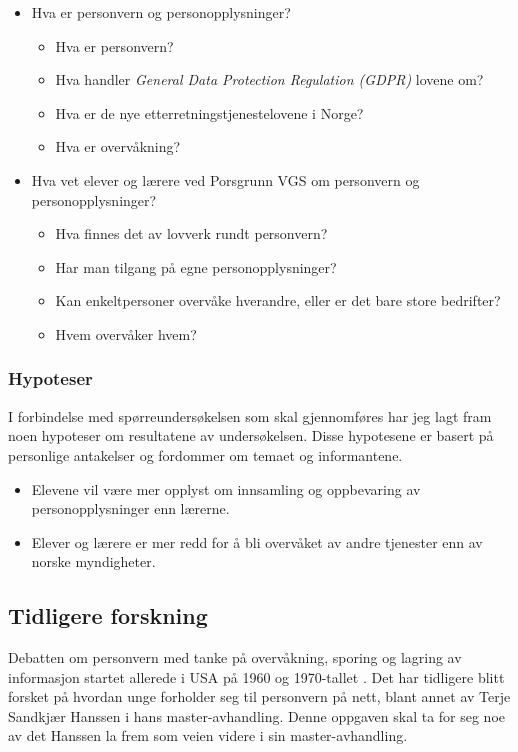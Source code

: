 \begin{itemize}
    \item Hva er personvern og personopplysninger?
    \begin{itemize}
        \item Hva er personvern?
        \item Hva handler \textit{General Data Protection Regulation (GDPR)} lovene om?
        \item Hva er de nye etterretningstjenestelovene i Norge?
        \item Hva er overvåkning?
    \end{itemize}
    \item Hva vet elever og lærere ved Porsgrunn VGS om personvern og personopplysninger?
    \begin{itemize}
        \item Hva finnes det av lovverk rundt personvern?
        \item Har man tilgang på egne personopplysninger?
        \item Kan enkeltpersoner overvåke hverandre, eller er det bare store bedrifter? 
        \item Hvem overvåker hvem?
    \end{itemize}
\end{itemize}

\subsubsection{Hypoteser}\label{subsubsec:hypoteser}
I forbindelse med spørreundersøkelsen som skal gjennomføres har jeg lagt fram noen hypoteser om resultatene av undersøkelsen. Disse hypotesene er basert på personlige antakelser og fordommer om temaet og informantene.

\begin{itemize}
    \item Elevene vil være mer opplyst om innsamling og oppbevaring av personopplysninger enn lærerne.
    \item Elever og lærere er mer redd for å bli overvåket av andre tjenester enn av norske myndigheter.
\end{itemize}

\subsection{Tidligere forskning}
Debatten om personvern med tanke på overvåkning, sporing og lagring av informasjon startet allerede i USA på 1960 og 1970-tallet \parencite[36]{bok:nissenbaum}. Det har tidligere blitt forsket på hvordan unge forholder seg til personvern på nett, blant annet av Terje Sandkjær Hanssen i hans master-avhandling. Denne oppgaven skal ta for seg noe av det Hanssen la frem som veien videre i sin master-avhandling. \parencite{master:hanssen}


